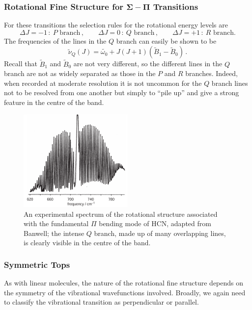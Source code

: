 \documentclass{article}
\theoremstyle{plain}\theoremheaderfont{\normalfont\itshape}\theorembodyfont{\rmfamily}\theoremseparator{.}\newtheorem*{rem}{Remark}\newtheorem*{ex}{Example}\newtheorem*{proof}{Proof}\newtheorem*{altp}{Alternative proof}
\theoremstyle{plain}\theoremheaderfont{\normalfont\bfseries}\theorembodyfont{\rmfamily}\theoremseparator{.}\newtheorem{thm}{Theorem}[section]\newtheorem{lem}[thm]{Lemma}\newtheorem{prop}[thm]{Proposition}\newtheorem*{cor}{Corollary}\newtheorem{defn}[thm]{Definition}\newtheorem{clm}[thm]{Claim}\newtheorem{clminproof}{Claim}\newtheorem{pos}{Postulate}[section]
\theoremstyle{break}\theoremheaderfont{\normalfont\itshape}\theorembodyfont{\rmfamily}\theoremseparator{.\medskip}\newtheorem*{proofskip}{Proof}\newtheorem*{exs}{Examples}\newtheorem*{rems}{Remarks}
\theoremstyle{break}\theoremheaderfont{\normalfont\bfseries}\theorembodyfont{\rmfamily}\theoremseparator{.\medskip}\newtheorem{lemskip}[thm]{Lemma}\newtheorem{defnskip}[thm]{Definition}\newtheorem{propskip}[thm]{Proposition}\newtheorem{thmskip}[thm]{Theorem}
\numberwithin{equation}{section}
\begin{document}
    \subsubsection*{Rotational Fine Structure for \texorpdfstring{\(\bm{\Sigma-\Pi}\)}{Σ-Π} Transitions}
    For these transitions the selection rules for the rotational energy levels are
    \begin{equation}
        \Delta J=-1\,:\ P\text{ branch}\,,\qquad\Delta J=0\,:\ Q\text{ branch}\,,\qquad\Delta J=+1\,:\ R\text{ branch.}
    \end{equation}
    The frequencies of the lines in the \(Q\) branch can easily be shown to be
    \begin{equation}
        \tilde{\nu}_Q(J)=\tilde{\omega_0}+J(J+1)(\tilde{B}_1-\tilde{B}_0)\,.
    \end{equation}
    Recall that \(\tilde{B}_1\) and \(\tilde{B}_0\) are not very different, so the different lines in the \(Q\) branch are not as widely separated as those in the \(P\) and \(R\) branches. Indeed, when recorded at moderate resolution it is not uncommon for the \(Q\) branch lines not to be resolved from one another but simply to ``pile up'' and give a strong feature in the centre of the band.
    \begin{figure}
        \centering
        \includegraphics[width=0.5\textwidth]{HCN_vibrot_pi.png}
        \caption{An experimental spectrum of the rotational structure associated with the fundamental \(\Pi\) bending mode of \(\mathrm{HCN}\), adapted from Banwell; the intense \(Q\) branch, made up of many overlapping lines, is clearly visible in the centre of the band.}
    \end{figure}

    \subsubsection{Symmetric Tops}
    As with linear molecules, the nature of the rotational fine structure depends on the symmetry of the vibrational wavefunctions involved. Broadly, we again need to classify the vibrational transition as perpendicular or parallel.
\end{document}
